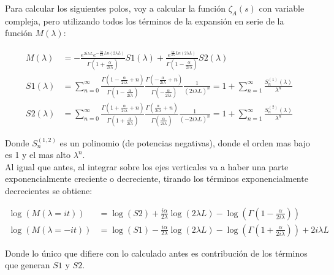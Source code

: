 Para calcular los siguientes polos, voy a calcular la función $\zeta _A (s) $ con variable compleja, pero utilizando todos los términos de la expansión en serie de la función $M ( \lambda )$:

\begin{equation}
\begin{aligned}
M( \lambda ) &= 
-
 \frac{e ^{2 i \lambda L } e ^{ - \frac{i \alpha  }{2 \lambda } Ln \left( 2 \lambda L \right) }  }
      { \Gamma \left( 1 + \frac{ \alpha}{2 i \lambda}  \right) } S1 ( \lambda ) +
 \frac{ e ^{   \frac{i \alpha  } {2 \lambda } Ln \left(2 \lambda L \right) } }
      { \Gamma \left( 1 - \frac{ \alpha}{2 i \lambda}  \right)   } S2 ( \lambda )  \\[10pt]      
S1 ( \lambda ) &= \sum _{n=0} ^{ \infty }
\frac{\Gamma (1 - \frac{ \alpha}{2 i \lambda} + n )}{\Gamma (1 - \frac{ \alpha}{2 i \lambda})} 
\frac{\Gamma (- \frac{ \alpha}{2 i \lambda} + n )}{\Gamma (- \frac{\alpha}{2 i \lambda})} 
\frac{1}{( 2 i \lambda L ) ^n} = 
1 + \sum _{n=1} ^{\infty} \frac{S ^{(1)} _n (\lambda)}{\lambda ^n} \\[10pt]
S2 (\lambda ) &= \sum _{n=0 } ^{\infty}
\frac{ \Gamma ( 1 + \frac{ \alpha}{2 i \lambda } + n ) }{\Gamma ( 1 + \frac{ \alpha}{2 i \lambda } )}
\frac{\Gamma ( \frac{ \alpha }{2 i \lambda} + n )}{\Gamma ( \frac{ \alpha }{2 i \lambda} )}
\frac{1}{( - 2 i \lambda L ) ^n} = 
1 + \sum _{n=1} ^{\infty} \frac{S ^{(2)} _n (\lambda)}{\lambda ^n}
\end{aligned}
\label{larga}
\end{equation}

Donde $S _n ^{(1,2)}$ es un polinomio (de potencias negativas), donde el orden mas bajo es 1 y el mas alto $\lambda ^n$. \\


Al igual que antes, al integrar sobre los ejes verticales va a haber una parte exponencialmente creciente o decreciente, tirando los términos exponencialmente decrecientes se obtiene:


\begin{align}
 \log ( M ( \lambda = i t ) ) &=   \log (S2) + 
\frac{i \alpha }{2 \lambda}  \log (2 \lambda L) - 
 \log ( \Gamma( 1 - \frac{ \alpha}{2 i \lambda} ) ) \\ 
 \log ( M ( \lambda = -i t ) ) &=  \log (S1) -  
\frac{i \alpha }{2 \lambda}  \log ( 2 \lambda L ) - 
 \log ( \Gamma ( 1 + \frac{ \alpha}{2 i \lambda} )) +
2 i \lambda L  \nonumber
\end{align}

Donde lo único que difiere con lo calculado antes es contribución de los términos que generan $S1$ y $S2$. \\




